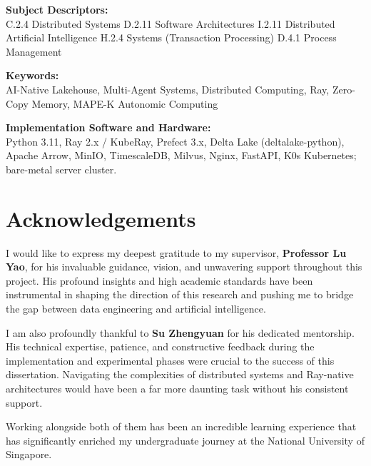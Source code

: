 \documentclass[12pt, a4paper]{report}
\begin{document}
\vspace{1em}
\noindent\textbf{Subject Descriptors:}\\
C.2.4 Distributed Systems \quad
D.2.11 Software Architectures \quad
I.2.11 Distributed Artificial Intelligence \quad
H.2.4 Systems (Transaction Processing) \quad
D.4.1 Process Management

\vspace{0.5em}
\noindent\textbf{Keywords:}\\
AI-Native Lakehouse, Multi-Agent Systems, Distributed Computing, Ray, Zero-Copy Memory, MAPE-K Autonomic Computing

\vspace{0.5em}
\noindent\textbf{Implementation Software and Hardware:}\\
Python 3.11, Ray 2.x / KubeRay, Prefect 3.x, Delta Lake (deltalake-python), Apache Arrow, MinIO, TimescaleDB, Milvus, Nginx, FastAPI, K0s Kubernetes; bare-metal server cluster.

\chapter*{Acknowledgements}

I would like to express my deepest gratitude to my supervisor, \textbf{Professor Lu Yao}, for his invaluable guidance, vision, and unwavering support throughout this project. His profound insights and high academic standards have been instrumental in shaping the direction of this research and pushing me to bridge the gap between data engineering and artificial intelligence.

I am also profoundly thankful to \textbf{Su Zhengyuan} for his dedicated mentorship. His technical expertise, patience, and constructive feedback during the implementation and experimental phases were crucial to the success of this dissertation. Navigating the complexities of distributed systems and Ray-native architectures would have been a far more daunting task without his consistent support. 

Working alongside both of them has been an incredible learning experience that has significantly enriched my undergraduate journey at the National University of Singapore.

\vspace{1.5cm}
\end{document}
